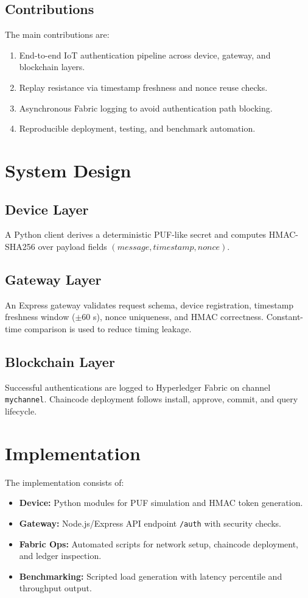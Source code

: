 \documentclass[conference]{IEEEtran}
\begin{document}
\subsection{Contributions}
The main contributions are:
\begin{enumerate}
\item End-to-end IoT authentication pipeline across device, gateway, and blockchain layers.
\item Replay resistance via timestamp freshness and nonce reuse checks.
\item Asynchronous Fabric logging to avoid authentication path blocking.
\item Reproducible deployment, testing, and benchmark automation.
\end{enumerate}

\section{System Design}
\subsection{Device Layer}
A Python client derives a deterministic PUF-like secret and computes HMAC-SHA256 over payload fields $(message, timestamp, nonce)$.

\subsection{Gateway Layer}
An Express gateway validates request schema, device registration, timestamp freshness window ($\pm 60$ s), nonce uniqueness, and HMAC correctness. Constant-time comparison is used to reduce timing leakage.

\subsection{Blockchain Layer}
Successful authentications are logged to Hyperledger Fabric on channel \texttt{mychannel}. Chaincode deployment follows install, approve, commit, and query lifecycle.

\section{Implementation}
The implementation consists of:
\begin{itemize}
\item \textbf{Device:} Python modules for PUF simulation and HMAC token generation.
\item \textbf{Gateway:} Node.js/Express API endpoint \texttt{/auth} with security checks.
\item \textbf{Fabric Ops:} Automated scripts for network setup, chaincode deployment, and ledger inspection.
\item \textbf{Benchmarking:} Scripted load generation with latency percentile and throughput output.
\end{itemize}
\end{document}
